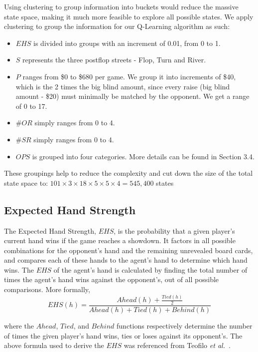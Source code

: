 \documentclass{article}
\begin{document}
Using clustering to group information into buckets would reduce the massive state space, making it much more feasible to explore all possible states. We apply clustering to group the information for our Q-Learning algorithm as such:
\begin{itemize}
  \item $EHS$ is divided into groups with an increment of 0.01, from 0 to 1.
  \item $S$ represents the three postflop streets - Flop, Turn and River.
  \item $P$ ranges from \$0 to \$680 per game. We group it into increments of \$40, which is the 2 times the big blind amount, since every raise (big blind amount - \$20) must minimally be matched by the opponent. We get a range of 0 to 17.
  \item $\#OR$ simply ranges from 0 to 4.
  \item $\#SR$ simply ranges from 0 to 4.
  \item $OPS$ is grouped into four categories. More details can be found in Section 3.4.
\end{itemize}

These groupings help to reduce the complexity and cut down the size of the total state space to: $101 \times 3 \times 18 \times 5 \times 5 \times 4 = 545,400$ states


\subsection{Expected Hand Strength}

The Expected Hand Strength, $EHS$, is the probability that a given player's current hand wins if the game reaches a showdown. It factors in all possible combinations for the opponent's hand and the remaining unrevealed board cards, and compares each of these hands to the agent's hand to determine which hand wins. The $EHS$ of the agent's hand is calculated by finding the total number of times the agent's hand wins against the opponent's, out of all possible comparisons. More formally,
\begin{displaymath}
  EHS(h)= \frac{Ahead(h)+\frac{Tied(h)}{2}}{Ahead(h) + Tied(h) + Behind(h)}
\end{displaymath}

\noindent where the $Ahead$, $Tied$, and $Behind$ functions respectively determine the number of times the given player's hand wins, ties or loses against its opponent's. The above formula used to derive the $EHS$ was referenced from Teofilo \textit{et al.}~. 
\end{document}
